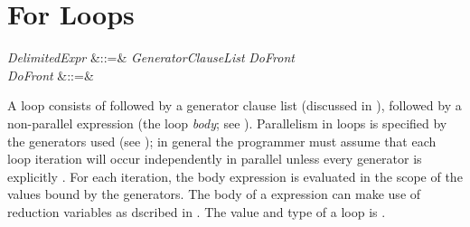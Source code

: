 %
%
%
%

\section{For Loops}


\begin{Grammar}
\emph{DelimitedExpr} &::=&
 \emph{GeneratorClauseList} \emph{DoFront} \\

\emph{DoFront} &::=&    \\

\end{Grammar}

A  loop consists of 
followed by a generator clause list (discussed in ),
followed by a non-parallel  expression (the loop \emph{body};
see ).  Parallelism in  loops is specified
by the generators used (see ); in general the
programmer must assume that each loop iteration will occur
independently in parallel unless every generator is explicitly
.  For each iteration, the body expression is
evaluated in the scope of the values bound by the generators.
The body of a  expression can make use of reduction variables as
dscribed in .
The value and type of a  loop is \EXP{()}.
